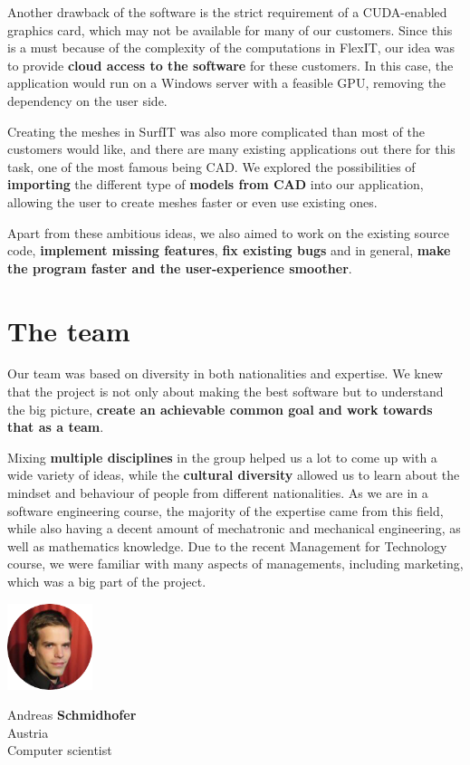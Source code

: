 \documentclass[a4paper, 11pt, article]{report}
\begin{document}
Another drawback of the software is the strict requirement of a CUDA-enabled graphics card, which may not be available for many of our customers. Since this is a must because of the complexity of the computations in FlexIT, our idea was to provide \textbf{cloud access to the software} for these customers. In this case, the application would run on a Windows server with a feasible GPU, removing the dependency on the user side.

Creating the meshes in SurfIT was also more complicated than most of the customers would like, and there are many existing applications out there for this task, one of the most famous being CAD. We explored the possibilities of \textbf{importing} the different type of \textbf{models from CAD} into our application, allowing the user to create meshes faster or even use existing ones.

Apart from these ambitious ideas, we also aimed to work on the existing source code, \textbf{implement missing features}, \textbf{fix existing bugs} and in general, \textbf{make the program faster and the user-experience smoother}.

\section{The team}

Our team was based on diversity in both nationalities and expertise. We knew that the project is not only about making the best software but to understand the big picture, \textbf{create an achievable common goal and work towards that as a team}. 

Mixing \textbf{multiple disciplines} in the group helped us a lot to come up with a wide variety of ideas, while the \textbf{cultural diversity} allowed us to learn about the mindset and behaviour of people from different nationalities. As we are in a software engineering course, the majority of the expertise came from this field, while also having a decent amount of mechatronic and  mechanical engineering, as well as mathematics knowledge. Due to the recent Management for Technology course, we were familiar with many aspects of managements, including marketing, which was a big part of the project. \\[0.3cm]

\newpage 

\begin{minipage}{0.3\textwidth}\raggedleft
\includegraphics[width=2.5cm]{images/andy}
\end{minipage}
\hfill
\begin{minipage}{0.7\textwidth}\center
Andreas \textbf{Schmidhofer} \\   
Austria \\
Computer scientist
\end{minipage} \\[1.5cm]
\end{document}
